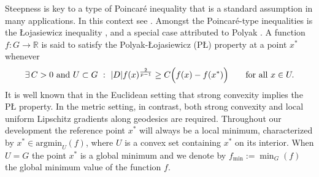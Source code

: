 \documentclass{article}
\theoremstyle{plain}\newtheorem{theorem}{Theorem}[section]
\theoremstyle{plain}\newtheorem{definition}[theorem]{Definition}
\theoremstyle{plain}\newtheorem{lemma}[theorem]{Lemma}
\theoremstyle{definition}\newtheorem{remark}[theorem]{Remark}
\theoremstyle{definition}\newtheorem{example}[theorem]{Example}
\theoremstyle{plain}\newtheorem{proposition}[theorem]{Proposition}
\theoremstyle{plain}\newtheorem{inference}[theorem]{Inference}
\theoremstyle{plain}\newtheorem{corollary}[theorem]{Corollary}
\theoremstyle{plain}\newtheorem{assumption}[theorem]{Assumption}
\newcommand{\bbR}{\mathbb{R}}
\begin{document}
Steepness is key to a type of Poincaré inequality that is a standard assumption in many applications. In this context see \cite[Eq.(4.3)]{Cheeger99}. Amongst the Poincaré-type inequalities is the Łojasiewicz inequality \cite{Loj63}, and a special case attributed to Polyak \cite{Polyak63}. A function $f:G\to\bbR$ is said to satisfy the Polyak-Łojasiewicz (PŁ) property at a point $x^*$ whenever
\begin{equation}\label{eq: PL}
    \exists\,C>0\mbox{ and }U\subset G~:~  |D|f(x)^{\frac{2}{p-1}}\geq C\Bigl(f(x)-f(x^*)\Bigr) \qquad\text{for all}\,\,x\in U.
\end{equation}
It is well known that in the Euclidean setting that strong convexity implies the PŁ property. In the metric setting, in contrast, both strong convexity and local uniform Lipschitz gradients along geodesics are required. Throughout our development the reference point $x^*$ will always be a local minimum, characterized by $x^*\in \mathrm{argmin}_U(f)$, where $U$ is a convex set containing $x^*$ on its interior. When $U=G$ the point $x^*$ is a global minimum and we denote by $f_{\min}:=\min_G(f)$ the global minimum value of the function $f$.
\end{document}
